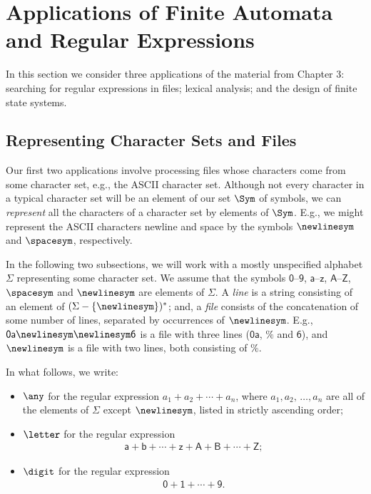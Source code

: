 \section{Applications of Finite Automata and
Regular Expressions}
\label{ApplicationsOfFiniteAutomataAndRegularExpressions}

In this section we consider three applications of the material from
Chapter 3: searching for regular expressions in files; lexical
analysis; and the design of finite state systems.

\subsection{Representing Character Sets and Files}

Our first two applications involve processing files whose characters
come from some character set, e.g., the ASCII character set.  Although
not every character in a typical character set will be an element of
our set $\Sym$ of symbols, we can \emph{represent} all the characters
of a character set by elements of $\Sym$.  E.g., we might represent
the ASCII characters newline and space by the symbols $\newlinesym$
and $\spacesym$, respectively.

In the following two subsections, we will work with a mostly
unspecified alphabet $\Sigma$ representing some character set.  We
assume that the symbols $\mathsf{0}$--$\mathsf{9}$,
$\mathsf{a}$--$\mathsf{z}$, $\mathsf{A}$--$\mathsf{Z}$, $\spacesym$
and $\newlinesym$ are elements of $\Sigma$.  A \emph{line} is a string
consisting of an element of $(\Sigma-\{\newlinesym\})^*$; and, a
\emph{file} consists of the concatenation of some number of lines,
separated by occurrences of $\newlinesym$.  E.g.,
$\mathsf{0a\newlinesym\newlinesym 6}$ is a file with three lines
($\mathsf{0a}$, $\mathsf{\%}$ and $\mathsf{6}$), and
$\mathsf{\newlinesym}$ is a file with two lines, both consisting of
$\%$.

In what follows, we write:
\begin{itemize}
\item $\any$ for the regular expression $a_1+a_2+\cdots+a_n$, where
  $a_1,a_2,\,\ldots,a_n$ are all of the elements of $\Sigma$ except
  $\newlinesym$, listed in strictly ascending order;

\item $\letter$ for the regular expression
  \begin{gather*}
    \mathsf{a + b + \cdots + z + A + B + \cdots + Z};
  \end{gather*}

\item $\digit$ for the regular expression
  \begin{gather*}
    \mathsf{0 + 1 + \cdots + 9}.
  \end{gather*}
\end{itemize}

